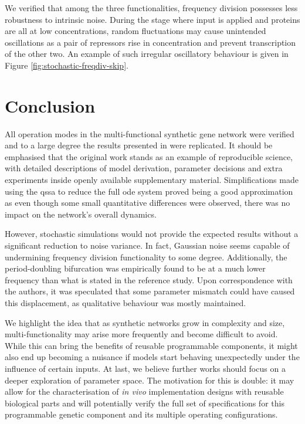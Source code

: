     We verified that among the three functionalities, frequency division possesses less robustness to intrinsic noise.
    During the stage where input is applied and proteins are all at low concentrations, random fluctuations may cause unintended oscillations as a pair of repressors rise in concentration and prevent transcription of the other two.
    An example of such irregular oscillatory behaviour is given in Figure \ref{fig:stochastic-freqdiv-skip}.





\section{Conclusion}

  All operation modes in the multi-functional synthetic gene network were verified and to a large degree the results presented in \cite{multif} were replicated.
  It should be emphasised that the original work stands as an example of reproducible science, with detailed descriptions of model derivation, parameter decisions and extra experiments inside openly available supplementary material.
  Simplifications made using the \ac{qssa} to reduce the full \ac{ode} system proved being a good approximation as even though some small quantitative differences were observed, there was no impact on the network's overall dynamics.

  However, stochastic simulations would not provide the expected results without a significant reduction to noise variance.
  In fact, Gaussian noise seems capable of undermining frequency division functionality to some degree.
  Additionally, the period-doubling bifurcation was empirically found to be at a much lower frequency than what is stated in the reference study.
  Upon correspondence with the authors, it was speculated that some parameter mismatch could have caused this displacement, as qualitative behaviour was mostly maintained.

  We highlight the idea that as synthetic networks grow in complexity and size, multi-functionality may arise more frequently and become difficult to avoid.
  While this can bring the benefits of reusable programmable components, it might also end up becoming a nuisance if models start behaving unexpectedly under the influence of certain inputs.
  At last, we believe further works should focus on a deeper exploration of parameter space.
  The motivation for this is double: it may allow for the characterisation of \textit{in vivo} implementation designs with reusable biological parts and will potentially verify the full set of specifications for this programmable genetic component and its multiple operating configurations.
